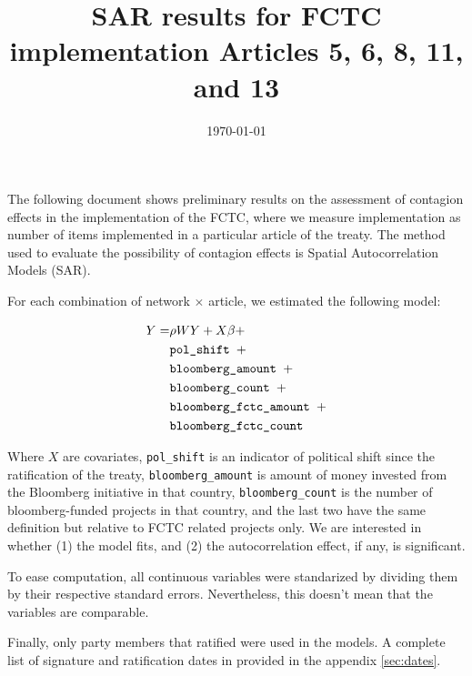 \documentclass[10pt]{article}
\title{SAR results for FCTC implementation Articles 5, 6, 8, 11, and 13}
\date{\today}
\begin{document}
\maketitle
\tableofcontents

The following document shows preliminary results on the assessment of contagion
effects in the implementation of the FCTC, where we measure implementation as
number of items implemented in a particular article of the treaty. The method
used to evaluate the possibility of contagion effects is Spatial Autocorrelation
Models (SAR). 

For each combination of network $\times$ article, we estimated the following
model:

\begin{align}
Y = & \rho W Y + X\beta + \\
 & \mbox{\tt pol\_shift } + \\
 & \mbox{\tt bloomberg\_amount } + \\
 & \mbox{\tt bloomberg\_count } + \\
 & \mbox{\tt bloomberg\_fctc\_amount } + \\
 & \mbox{\tt bloomberg\_fctc\_count }
\end{align}

Where $X$ are covariates, \texttt{pol\_shift} is an indicator of political shift
since the ratification of the treaty, \texttt{bloomberg\_amount} is
amount of money invested from the Bloomberg initiative in that country, 
\texttt{bloomberg\_count} is the number of bloomberg-funded projects in that 
country, and the last two have the same definition but relative to FCTC related
projects only. We are interested in whether (1) the model fits,
and (2) the autocorrelation effect, if any, is significant.

To ease computation, all continuous variables were standarized by dividing them
by their respective standard errors. Nevertheless, this doesn't mean that the
variables are comparable.

Finally, only party members that ratified were used in the models. A complete
list of signature and ratification dates in provided in the appendix \autoref{sec:dates}.


\end{document}
